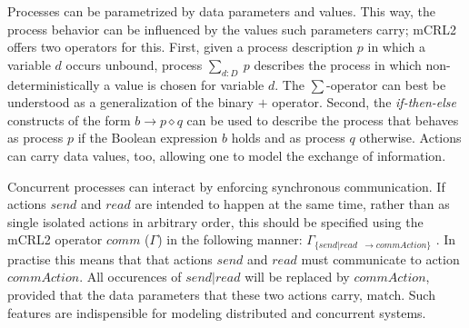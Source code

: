 \documentclass[sort&compress,preprint,3p]{elsarticle}
\begin{document}
Processes can be parametrized by data parameters and values. This way, the
process behavior can be influenced by the values such parameters carry;
mCRL2 offers two operators for this. First, given a process description
\begin{math}p\end{math} in which a variable $d$ occurs unbound, process
$\sum_{d:D}~p$ describes the process in which non-deterministically
a value is chosen for variable $d$. The $\sum$-operator can best be
understood as a generalization of the binary $+$ operator. Second, the
\emph{if-then-else} constructs of the form \begin{math}b\rightarrow
p\diamond q\end{math} can be used to describe the process that
behaves as process \begin{math}p\end{math} if the Boolean expression
\begin{math}b\end{math} holds and as process \begin{math}q\end{math}
otherwise.  Actions can carry data values, too, allowing one to model
the exchange of information. 

Concurrent processes can interact by enforcing synchronous communication.
If actions \begin{math}send\end{math} and \begin{math}read\end{math}
are intended to happen at the same time, rather than as single isolated
actions in arbitrary order, this should be specified using the mCRL2 operator
\begin{math}comm\end{math} ($ \Gamma$) in the following manner:
$ \Gamma_{\{send|
   read} $
  $  _{\rightarrow commAction\}} $
. In practise this means that that actions \begin{math}send\end{math} and \begin{math}read\end{math}
must communicate to action \begin{math}commAction\end{math}. All occurences
of \begin{math}send | read\end{math} will be replaced by \begin{math}commAction\end{math},
provided that the data parameters that these two actions carry, match.
Such features are indispensible for modeling
distributed and concurrent systems.
\end{document}
